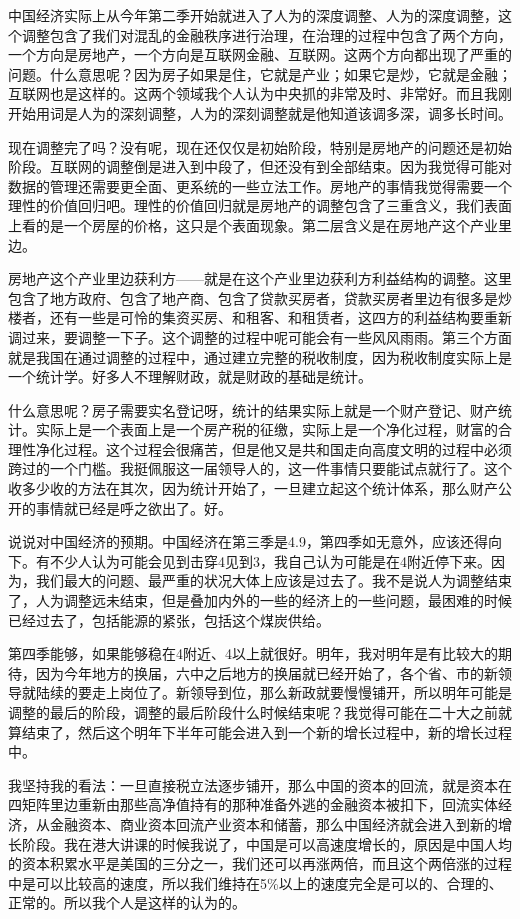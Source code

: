 \documentclass[UTF8, 12pt, a4paper]{ctexrep}
\begin{document}
中国经济实际上从今年第二季开始就进入了人为的深度调整、人为的深度调整，这个调整包含了我们对混乱的金融秩序进行治理，在治理的过程中包含了两个方向，一个方向是房地产，一个方向是互联网金融、互联网。这两个方向都出现了严重的问题。什么意思呢？因为房子如果是住，它就是产业；如果它是炒，它就是金融；互联网也是这样的。这两个领域我个人认为中央抓的非常及时、非常好。而且我刚开始用词是人为的深刻调整，人为的深刻调整就是他知道该调多深，调多长时间。

现在调整完了吗？没有呢，现在还仅仅是初始阶段，特别是房地产的问题还是初始阶段。互联网的调整倒是进入到中段了，但还没有到全部结束。因为我觉得可能对数据的管理还需要更全面、更系统的一些立法工作。房地产的事情我觉得需要一个理性的价值回归吧。理性的价值回归就是房地产的调整包含了三重含义，我们表面上看的是一个房屋的价格，这只是个表面现象。第二层含义是在房地产这个产业里边。

房地产这个产业里边获利方——就是在这个产业里边获利方利益结构的调整。这里包含了地方政府、包含了地产商、包含了贷款买房者，贷款买房者里边有很多是炒楼者，还有一些是可怜的集资买房、和租客、和租赁者，这四方的利益结构要重新调过来，要调整一下子。这个调整的过程中呢可能会有一些风风雨雨。第三个方面就是我国在通过调整的过程中，通过建立完整的税收制度，因为税收制度实际上是一个统计学。好多人不理解财政，就是财政的基础是统计。

什么意思呢？房子需要实名登记呀，统计的结果实际上就是一个财产登记、财产统计。实际上是一个表面上是一个房产税的征缴，实际上是一个净化过程，财富的合理性净化过程。这个过程会很痛苦，但是他又是共和国走向高度文明的过程中必须跨过的一个门槛。我挺佩服这一届领导人的，这一件事情只要能试点就行了。这个收多少收的方法在其次，因为统计开始了，一旦建立起这个统计体系，那么财产公开的事情就已经是呼之欲出了。好。

说说对中国经济的预期。中国经济在第三季是4.9，第四季如无意外，应该还得向下。有不少人认为可能会见到击穿4见到3，我自己认为可能是在4附近停下来。因为，我们最大的问题、最严重的状况大体上应该是过去了。我不是说人为调整结束了，人为调整远未结束，但是叠加内外的一些的经济上的一些问题，最困难的时候已经过去了，包括能源的紧张，包括这个煤炭供给。

第四季能够，如果能够稳在4附近、4以上就很好。明年，我对明年是有比较大的期待，因为今年地方的换届，六中之后地方的换届就已经开始了，各个省、市的新领导就陆续的要走上岗位了。新领导到位，那么新政就要慢慢铺开，所以明年可能是调整的最后的阶段，调整的最后阶段什么时候结束呢？我觉得可能在二十大之前就算结束了，然后这个明年下半年可能会进入到一个新的增长过程中，新的增长过程中。

我坚持我的看法：一旦直接税立法逐步铺开，那么中国的资本的回流，就是资本在四矩阵里边重新由那些高净值持有的那种准备外逃的金融资本被扣下，回流实体经济，从金融资本、商业资本回流产业资本和储蓄，那么中国经济就会进入到新的增长阶段。我在港大讲课的时候我说了，中国是可以高速度增长的，原因是中国人均的资本积累水平是美国的三分之一，我们还可以再涨两倍，而且这个两倍涨的过程中是可以比较高的速度，所以我们维持在5\%以上的速度完全是可以的、合理的、正常的。所以我个人是这样的认为的。
\end{document}
